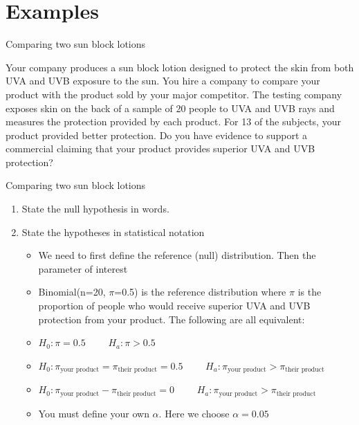 \documentclass{beamer}\usepackage[]{graphicx}\usepackage[]{color}
\begin{document}
\section{Examples}



\begin{frame}{Comparing two sun block lotions}

\begin{example}
	Your company produces a sun block lotion designed to protect the skin from both UVA and UVB exposure to the sun. You hire a company to compare your product with the product sold by your major competitor. The testing company exposes skin on the back of a sample of 20 people to UVA and UVB rays and measures the protection provided by each product. For 13 of the subjects, your product provided better protection. Do you have evidence to support a commercial claiming that your product provides superior UVA and UVB protection?
\end{example}


\end{frame}



\begin{frame}[fragile]{Comparing two sun block lotions}
\small
\begin{enumerate}
	\setlength\itemsep{1em}
	\item State the null hypothesis in words. \pause
	\item State the hypotheses in statistical notation \pause
	\begin{itemize}
			\setlength\itemsep{.71em}
		\item We need to first define the reference (null) distribution. Then the parameter of interest \pause
		\item Binomial(n=20, $\pi$=0.5) is the reference distribution where $\pi$ is the proportion of people who would receive superior UVA and UVB protection from your product. \pause
		The following are all equivalent: 
		\item[] $H_0: \pi = 0.5 \qquad$ $H_a: \pi > 0.5$ \pause
		\item[] $H_0: \pi_{\textrm{your product}}=\pi_{\textrm{their product}} = 0.5 \qquad$ $H_a: \pi_{\textrm{your product}} > \pi_{\textrm{their product}}$ \pause
		\item[] $H_0: \pi_{\textrm{your product}}-\pi_{\textrm{their product}} = 0 \qquad$ $H_a: \pi_{\textrm{your product}} > \pi_{\textrm{their product}}$ \pause
		\item You must define your own $\alpha$. Here we choose $\alpha=0.05$ 		
	\end{itemize}
      
 
\end{enumerate}

\end{frame}
\end{document}
